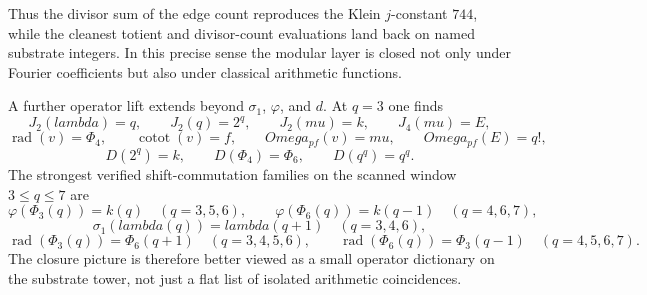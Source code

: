 \documentclass[12pt,a4paper]{article}
\def\mathrm#1{#1}%
\def\lambda{lambda}%
\def\mu{mu}%
\def\Phi#1{Phi#1}%
\def\Omega{Omega}%
\theoremstyle{definition}
\begin{document}
Thus the divisor sum of the edge count reproduces the Klein $j$-constant $744$, while the cleanest totient and divisor-count evaluations land back on named substrate integers. In this precise sense the modular layer is closed not only under Fourier coefficients but also under classical arithmetic functions.

A further operator lift extends beyond $\sigma_1$, $\varphi$, and $d$. At $q=3$ one finds
\[
J_2(\lambda) = q, \qquad J_2(q) = 2^q, \qquad J_2(\mu) = k, \qquad J_4(\mu) = E,
\]
\[
\operatorname{rad}(v) = \Phi_4, \qquad \operatorname{cotot}(v) = f, \qquad \Omega_{\mathrm{pf}}(v) = \mu, \qquad \Omega_{\mathrm{pf}}(E) = q!,
\]
\[
D(2^q) = k, \qquad D(\Phi_4) = \Phi_6, \qquad D(q^q) = q^q.
\]
The strongest verified shift-commutation families on the scanned window $3 \le q \le 7$ are
\[
\varphi(\Phi_3(q)) = k(q) \quad (q=3,5,6), \qquad \varphi(\Phi_6(q)) = k(q-1) \quad (q=4,6,7),
\]
\[
\sigma_1(\lambda(q)) = \lambda(q+1) \quad (q=3,4,6),
\]
\[
\operatorname{rad}(\Phi_3(q)) = \Phi_6(q+1) \quad (q=3,4,5,6), \qquad \operatorname{rad}(\Phi_6(q)) = \Phi_3(q-1) \quad (q=4,5,6,7).
\]
The closure picture is therefore better viewed as a small operator dictionary on the substrate tower, not just a flat list of isolated arithmetic coincidences.
\end{document}
